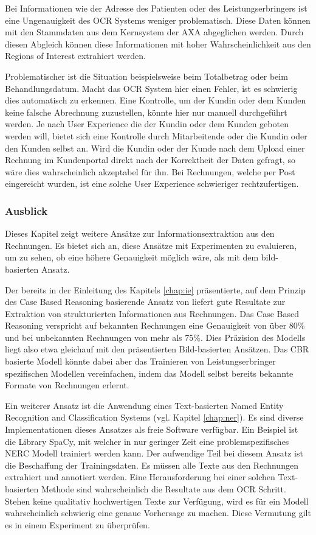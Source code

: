 Bei Informationen wie der Adresse des Patienten oder des Leistungserbringers ist eine Ungenauigkeit des OCR Systems weniger problematisch. Diese Daten können mit den Stammdaten aus dem Kernsystem der AXA abgeglichen werden. Durch diesen Abgleich können diese Informationen mit hoher Wahrscheinlichkeit aus den Regions of Interest extrahiert werden.

Problematischer ist die Situation beispielsweise beim Totalbetrag oder beim Behandlungsdatum. Macht das OCR System hier einen Fehler, ist es schwierig dies automatisch zu erkennen. Eine Kontrolle, um der Kundin oder dem Kunden keine falsche Abrechnung zuzustellen, könnte hier nur manuell durchgeführt werden. Je nach User Experience die der Kundin oder dem Kunden geboten werden will, bietet sich eine Kontrolle durch Mitarbeitende oder die Kundin oder den Kunden selbst an. Wird die Kundin oder der Kunde nach dem Upload einer Rechnung im Kundenportal direkt nach der Korrektheit der Daten gefragt, so wäre dies wahrscheinlich akzeptabel für ihn. Bei Rechnungen, welche per Post eingereicht wurden, ist eine solche User Experience schwieriger rechtzufertigen.




\subsubsection{Ausblick}

Dieses Kapitel zeigt weitere Ansätze zur Informationsextraktion aus den Rechnungen. Es bietet sich an, diese Ansätze mit Experimenten zu evaluieren, um zu sehen, ob eine höhere Genauigkeit möglich wäre, als mit dem bild-basierten Ansatz.

Der bereits in der Einleitung des Kapitels \ref{chap:ie} präsentierte, auf dem Prinzip des Case Based Reasoning basierende Ansatz von \textcite{Hamza} liefert gute Resultate zur Extraktion von strukturierten Informationen aus Rechnungen. Das Case Based Reasoning verspricht auf bekannten Rechnungen eine Genauigkeit von über 80\% und bei unbekannten Rechnungen von mehr als 75\%. Dies Präzision des Modells liegt also etwa gleichauf mit den präsentierten Bild-basierten Ansätzen. Das CBR basierte Modell könnte dabei aber das Trainieren von Leistungserbringer spezifischen Modellen vereinfachen, indem das Modell selbst bereits bekannte Formate von Rechnungen erlernt.

Ein weiterer Ansatz ist die Anwendung eines Text-basierten Named Entity Recognition and Classification Systems (vgl. Kapitel \ref{chap:ner}). Es sind diverse Implementationen dieses Ansatzes als freie Software verfügbar. Ein Beispiel ist die Library SpaCy, mit welcher in nur geringer Zeit eine problemspezifisches NERC Modell trainiert werden kann. Der aufwendige Teil bei diesem Ansatz ist die Beschaffung der Trainingsdaten. Es müssen alle Texte aus den Rechnungen extrahiert und annotiert werden. Eine Herausforderung bei einer solchen Text-basierten Methode sind wahrscheinlich die Resultate aus dem OCR Schritt. Stehen keine qualitativ hochwertigen Texte zur Verfügung, wird es für ein Modell wahrscheinlich schwierig eine genaue Vorhersage zu machen. Diese Vermutung gilt es in einem Experiment zu überprüfen.


